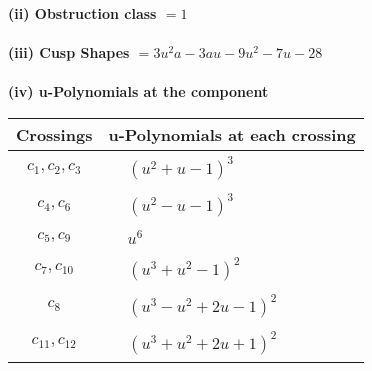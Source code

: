 \documentclass[1p]{elsarticle_modified}
\theoremstyle{definition}
\begin{document}
\flushleft \textbf{(ii) Obstruction class $= 1$}\\~\\
\flushleft \textbf{(iii) Cusp Shapes $= 3 u^2 a-3 a u-9 u^2-7 u-28$}\\~\\
\newpage\renewcommand{\arraystretch}{1}
\flushleft \textbf{(iv) u-Polynomials at the component}\newline \\
\begin{tabular}{m{50pt}|m{274pt}}
Crossings & \hspace{64pt}u-Polynomials at each crossing \\
\hline $$\begin{aligned}c_{1},c_{2},c_{3}\end{aligned}$$&$\begin{aligned}
&(u^2+u-1)^3
\end{aligned}$\\
\hline $$\begin{aligned}c_{4},c_{6}\end{aligned}$$&$\begin{aligned}
&(u^2- u-1)^3
\end{aligned}$\\
\hline $$\begin{aligned}c_{5},c_{9}\end{aligned}$$&$\begin{aligned}
&u^6
\end{aligned}$\\
\hline $$\begin{aligned}c_{7},c_{10}\end{aligned}$$&$\begin{aligned}
&(u^3+u^2-1)^2
\end{aligned}$\\
\hline $$\begin{aligned}c_{8}\end{aligned}$$&$\begin{aligned}
&(u^3- u^2+2 u-1)^2
\end{aligned}$\\
\hline $$\begin{aligned}c_{11},c_{12}\end{aligned}$$&$\begin{aligned}
&(u^3+u^2+2 u+1)^2
\end{aligned}$\\
\hline
\end{tabular}\\~\\
\end{document}
